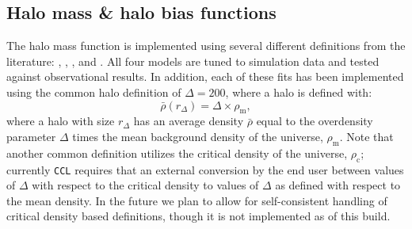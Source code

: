\documentclass[\docopts]{\docclass}
\newcommand{\ccl}{{\tt CCL}\xspace}
\begin{document}
\begin{comment}
The {\tt ccl\_tracer\_corr\_legendre} routine computes these transform to convert angular power spectra, $C_\ell$, into correlation functions. We use the associated Legendre function implementation from the {\tt GSL} library. {\tt ccl\_tracer\_corr\_legendre} routine evaluations can be very slow, especially for polynomials $P_\ell^m$ with $m>0$. Note that $P_\ell^m$ evaluations need to be done only once and can then be saved as long as $\ell$ and $\theta$ values do not change. However, \ccl has not yet implemented this feature.

\paragraph{Hankel Transform}
Notice that in the flat-sky limit, the expressions in Eqs.~\ref{eq:xi_p}--\ref{eq:xi_m} can be written as Hankel transforms using the relation between $P_{\ell}^m$ and bessel functions $J_m$
\begin{align}
  P_{\ell}^m(\cos\theta)=(-1)^m\frac{(\ell+m)!}{(\ell-m)!}\ell^{-m}J_m(\ell\theta)
\end{align}
which yields final expressions that coincide with Eq. \ref{eq:xipxim}.

\end{comment}


%
%


\subsection{Halo mass \& halo bias functions}
\label{sec:hmf}

The halo mass function is implemented using several different definitions
from the literature: \citet{Tinker2008}, \citet{Tinker2010}, \citet{Angulo2012},
and \citet{Watson2013}. All four models are tuned to simulation data and
tested against observational results. In addition, each of these fits has
been implemented using the common halo definition of $\Delta = 200$, where a
halo is defined with:
\begin{equation}
\bar{\rho}(r_{\Delta}) = \Delta \times \rho_{\mathrm{m}},
\end{equation}
where a halo with size $r_{\Delta}$ has an average density $\bar{\rho}$ equal
to the overdensity parameter $\Delta$ times the mean background density of the
universe, $\rho_{\mathrm{m}}$. Note that another common definition utilizes the
critical density of the universe, $\rho_{\mathrm{c}}$; currently \ccl requires
that an external conversion by the end user between values of $\Delta$ with
respect to the critical density to values of $\Delta$ as defined with respect
to the mean density. In the future we plan to allow for self-consistent handling
of critical density based definitions, though it is not implemented as of this build.
\end{document}
